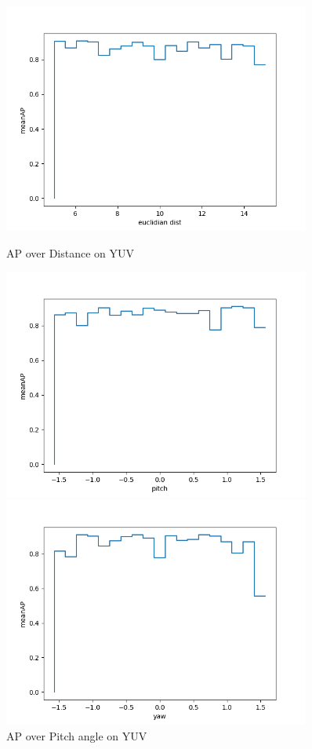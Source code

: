 \documentclass{article}
\begin{document}
\begin{figure}[!htb]
	\centering
	\begin{minipage}{.5\textwidth}
		\centering
		\includegraphics[width=0.9\textwidth]{meanAP-eucl}
		\caption{AP over Distance on YUV}
	\end{minipage}%
	\begin{minipage}{0.5\textwidth}
		\centering
		\includegraphics[width=0.9\textwidth]{meanAP-pitch}
		\caption{AP over Pitch angle on YUV}
	\end{minipage}
	\begin{minipage}{.5\textwidth}
		\centering
		\includegraphics[width=0.9\textwidth]{meanAP-yaw}

\end{minipage}
\end{figure}
\end{document}

